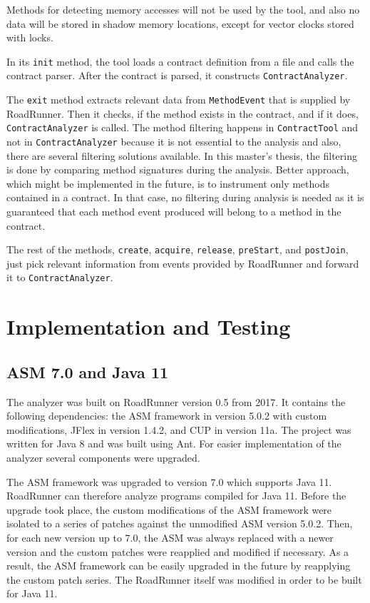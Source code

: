 Methods for detecting memory accesses will not be used by the tool, and also no
data will be stored in shadow memory locations, except for vector clocks stored
with locks.

In its \texttt{init} method, the tool loads a contract definition from a file
and calls the contract parser. After the contract is parsed, it constructs
\texttt{ContractAnalyzer}.

The \texttt{exit} method extracts relevant data from \texttt{MethodEvent} that
is supplied by RoadRunner. Then it checks, if the method exists in the contract,
and if it does, \texttt{ContractAnalyzer} is called. The method filtering
happens in \texttt{ContractTool} and not in \texttt{ContractAnalyzer} because it
is not essential to the analysis and also, there are several filtering solutions
available. In this master's thesis, the filtering is done by comparing method
signatures during the analysis. Better approach, which might be implemented in
the future, is to instrument only methods contained in a contract. In that case,
no filtering during analysis is needed as it is guaranteed that each method
event produced will belong to a method in the contract.

The rest of the methods, \texttt{create}, \texttt{acquire}, \texttt{release},
\texttt{preStart}, and \texttt{postJoin}, just pick relevant information from
events provided by RoadRunner and forward it to \texttt{ContractAnalyzer}.



\chapter{Implementation and Testing}
\label{chFive}

{\color{blue}\lipsum[2]}

\section{ASM 7.0 and Java 11}
The analyzer was built on RoadRunner version 0.5 from 2017. It contains the
following dependencies: the ASM framework in version 5.0.2 with custom
modifications, JFlex in version 1.4.2, and CUP in version 11a. The project was
written for Java 8 and was built using Ant. For easier implementation of the
analyzer several components were upgraded.

The ASM framework was upgraded to version 7.0 which supports Java 11. RoadRunner
can therefore analyze programs compiled for Java 11. Before the upgrade took
place, the custom modifications of the ASM framework were isolated to a series
of patches against the unmodified ASM version 5.0.2. Then, for each new version
up to 7.0, the ASM was always replaced with a newer version and the custom
patches were reapplied and modified if necessary. As a result, the ASM framework
can be easily upgraded in the future by reapplying the custom patch series. The
RoadRunner itself was modified in order to be built for Java 11.

